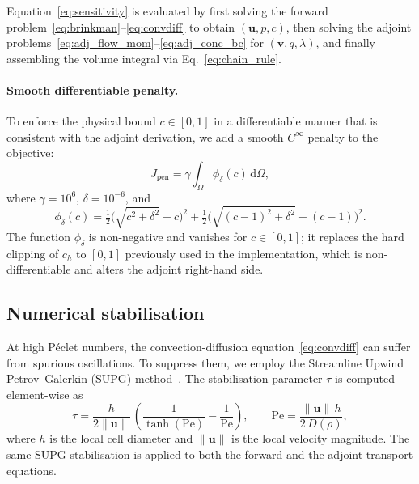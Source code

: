 Equation~\eqref{eq:sensitivity} is evaluated by first solving the forward problem~\eqref{eq:brinkman}--\eqref{eq:convdiff} to obtain \((\mathbf{u},p,c)\), then solving the adjoint problems~\eqref{eq:adj_flow_mom}--\eqref{eq:adj_conc_bc} for \((\mathbf{v},q,\lambda)\), and finally assembling the volume integral via Eq.~\eqref{eq:chain_rule}.


\paragraph{Smooth differentiable penalty.}
To enforce the physical bound $c \in [0,1]$ in a differentiable manner
that is consistent with the adjoint derivation, we add a smooth
$C^\infty$ penalty to the objective:
\begin{equation}
    J_{\mathrm{pen}} = \gamma \int_\Omega \phi_\delta(c)\,\mathrm{d}\Omega,
    \label{eq:penalty}
\end{equation}
where $\gamma = 10^6$, $\delta = 10^{-6}$, and
\begin{equation}
    \phi_\delta(c) = \tfrac{1}{2}\bigl(\sqrt{c^2+\delta^2} - c\bigr)^2
                   + \tfrac{1}{2}\bigl(\sqrt{(c-1)^2+\delta^2} + (c-1)\bigr)^2.
    \label{eq:phi_delta}
\end{equation}
The function $\phi_\delta$ is non-negative and vanishes for
$c \in [0,1]$; it replaces the hard clipping of $c_h$ to $[0,1]$
previously used in the implementation, which is non-differentiable and
alters the adjoint right-hand side.

\subsection{Numerical stabilisation}
\label{sec:supg}
At high Péclet numbers, the convection-diffusion equation~\eqref{eq:convdiff} can suffer from spurious oscillations.
To suppress them, we employ the Streamline Upwind Petrov--Galerkin (SUPG) method~\cite{brooks1982}.
The stabilisation parameter \(\tau\) is computed element-wise as
\begin{equation}
    \tau = \frac{h}{2\|\mathbf{u}\|}\,
           \left( \frac{1}{\tanh(\text{Pe})} - \frac{1}{\text{Pe}} \right),
    \qquad
    \text{Pe} = \frac{\|\mathbf{u}\|\,h}{2\,D(\rho)},
    \label{eq:supg}
\end{equation}
where \(h\) is the local cell diameter and \(\|\mathbf{u}\|\) is the local velocity magnitude.
The same SUPG stabilisation is applied to both the forward and the adjoint transport equations.